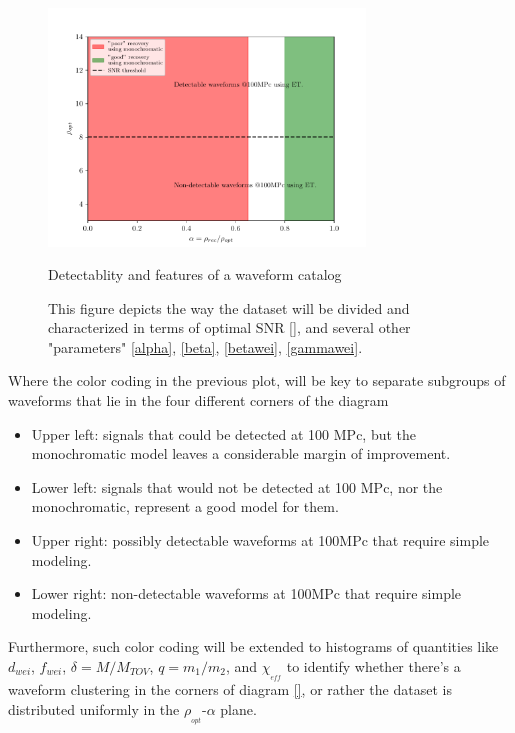 \begin{figure}[hbt!]
\begin{center}
\includegraphics[width=0.75\textwidth, angle=0]{images/Data_analysis/results/schematics.pdf}
\captionsetup{width=0.8\textwidth}
\caption{Detectablity and features of a waveform catalog}
\caption*{This figure depicts the way the dataset will be divided and characterized in terms of optimal SNR \ref{}, and several other "parameters" \ref{alpha}, \ref{beta}, \ref{betawei}, \ref{gammawei}.}
\label{regions}
\end{center} 
\end{figure}

\FloatBarrier

Where the color coding in the previous plot, will be key to separate subgroups of waveforms that lie in the four different corners of the diagram

\begin{itemize}
\item Upper left: signals that could be detected at 100 MPc, but the monochromatic model leaves a considerable margin of improvement.
\item Lower left: signals that would not be detected at 100 MPc, nor the monochromatic, represent a good model for them.
\item 
Upper right: possibly detectable waveforms at 100MPc that require simple modeling.
\item 
Lower right: non-detectable waveforms at 100MPc that require simple modeling.
\end{itemize}

Furthermore, such color coding will be extended to histograms of quantities like $d_{wei}$, $f_{wei}$, $\delta=M/M_{TOV}$, $q=m_1/m_2$, and  $\chi_{_{eff}}$ to identify whether there's a waveform clustering in the corners of diagram \ref{}, or rather the dataset is distributed uniformly in the $\rho_{_{opt}}$-$\alpha$ plane.


